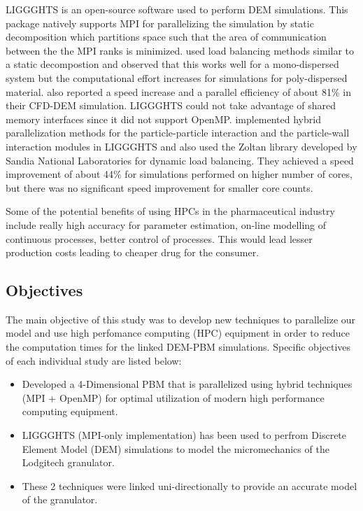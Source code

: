 \documentclass[preprint,11pt,authoryear]{elsarticle}
\begin{document}
	\par  LIGGGHTS is an open-source software used to perform DEM simulations. This package natively supports MPI for parallelizing the simulation by static decomposition which partitions space such that the area of communication between the the MPI ranks is minimized. \cite{kacianauskas2010} used load balancing methods similar to a static decompostion and observed that this works well for a mono-dispersed system but the computational effort increases for simulations for poly-dispersed material. \cite{Gopalakrishnan2013} also reported a speed increase and a parallel efficiency of about 81\% in their CFD-DEM simulation. LIGGGHTS could not take advantage of shared memory interfaces since it did not support OpenMP. \cite{Berger2015} implemented hybrid parallelization methods for the particle-particle interaction and the particle-wall interaction modules in LIGGGHTS and also used the Zoltan library \citep{Boman2012} developed by Sandia National Laboratories for dynamic load balancing. They achieved a speed improvement of about 44\% for simulations performed on higher number of cores, but there was no significant speed improvement for smaller core counts.
	\par Some of the potential benefits of using HPCs in the pharmaceutical industry include really high accuracy for parameter estimation, on-line modelling of continuous processes, better control of processes. This would lead lesser production costs leading to cheaper drug for the consumer.
	
	    \subsection{Objectives}
	    \par The main objective of this study was to develop new techniques to parallelize our model and use high perfomance computing (HPC) equipment in order to reduce the computation times for the linked DEM-PBM simulations. Specific objectives of each individual study are listed below: 
	    \begin{itemize}
	    \item Developed a 4-Dimensional PBM that is parallelized using hybrid techniques (MPI + OpenMP)  for optimal utilization of modern high performance computing equipment.
	    \item LIGGGHTS (MPI-only implementation) has been used to perfrom Discrete Element Model (DEM) simulations to  model the micromechanics of the Lodgitech granulator. 
		\item These 2 techniques were linked uni-directionally to provide an accurate model of the granulator.	    
	    \end{itemize}
\end{document}
